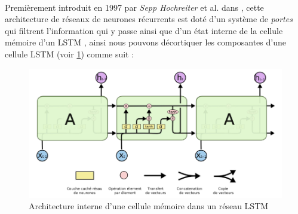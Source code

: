 		\paragraph{}
		Premièrement introduit en 1997 par \textit{	Sepp Hochreiter } et al. dans \cite{lstm_original_paper}, cette architecture de réseaux de neurones récurrents est doté d'un système de \textit{portes} qui filtrent l'information qui y passe ainsi que d'un état interne de la cellule mémoire d'un LSTM , ainsi nous pouvons décortiquer les composantes d'une cellule LSTM (voir \ref{lstm_architecture}) comme suit : 
		\begin{figure}[H]
			\centering
			\includegraphics[width=0.55\linewidth]{images/notions/lstm_arch.png}
			\caption{Architecture interne d'une cellule mémoire dans un réseau LSTM \cite{rnns_online}}
			\label{lstm_architecture}
		\end{figure}
